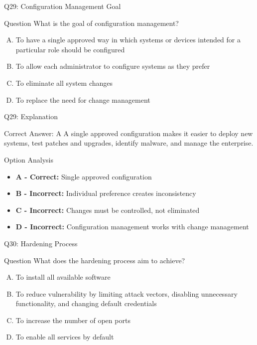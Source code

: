 \documentclass{beamer}
\begin{document}
	\begin{frame}{Q29: Configuration Management Goal}
		\begin{block}{Question}
			What is the goal of configuration management?
		\end{block}
		\begin{enumerate}[(A)]
			\item To have a single approved way in which systems or devices intended for a particular role should be configured
			\item To allow each administrator to configure systems as they prefer
			\item To eliminate all system changes
			\item To replace the need for change management
		\end{enumerate}
	\end{frame}
	
	\begin{frame}{Q29: Explanation}
		\begin{block}{Correct Answer: A}
			A single approved configuration makes it easier to deploy new systems, test patches and upgrades, identify malware, and manage the enterprise.
		\end{block}
		\begin{block}{Option Analysis}
			\begin{itemize}
				\item \textbf{A - Correct:} Single approved configuration
				\item \textbf{B - Incorrect:} Individual preference creates inconsistency
				\item \textbf{C - Incorrect:} Changes must be controlled, not eliminated
				\item \textbf{D - Incorrect:} Configuration management works with change management
			\end{itemize}
		\end{block}
	\end{frame}
	
	\begin{frame}{Q30: Hardening Process}
		\begin{block}{Question}
			What does the hardening process aim to achieve?
		\end{block}
		\begin{enumerate}[(A)]
			\item To install all available software
			\item To reduce vulnerability by limiting attack vectors, disabling unnecessary functionality, and changing default credentials
			\item To increase the number of open ports
			\item To enable all services by default
		\end{enumerate}
	\end{frame}
	
\end{document}
